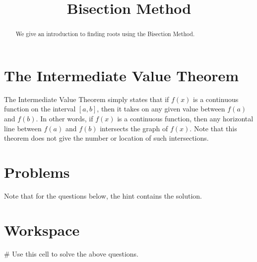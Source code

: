 \documentclass{ximera}
\title{Bisection Method}
\begin{document}
  
\begin{abstract}  
We give an introduction to finding roots using the Bisection Method.
\end{abstract}  
\maketitle

\section{The Intermediate Value Theorem}

The Intermediate Value Theorem simply states that if $f(x)$ is a continuous function on the interval $[a,b]$, then it takes on any given value between $f(a)$ and $f(b)$. In other words, if $f(x)$ is a continuous function, then any horizontal line between $f(a)$ and $f(b)$ intersects the graph of $f(x)$. Note that this theorem does not give the number or location of such intersections.

\begin{image}
\end{image}

\section{Problems}

Note that for the questions below, the hint contains the solution.

\begin{question}
\end{question}

\section{Workspace}

\begin{sageCell}
# Use this cell to solve the above questions.
\end{sageCell}
\end{document}
